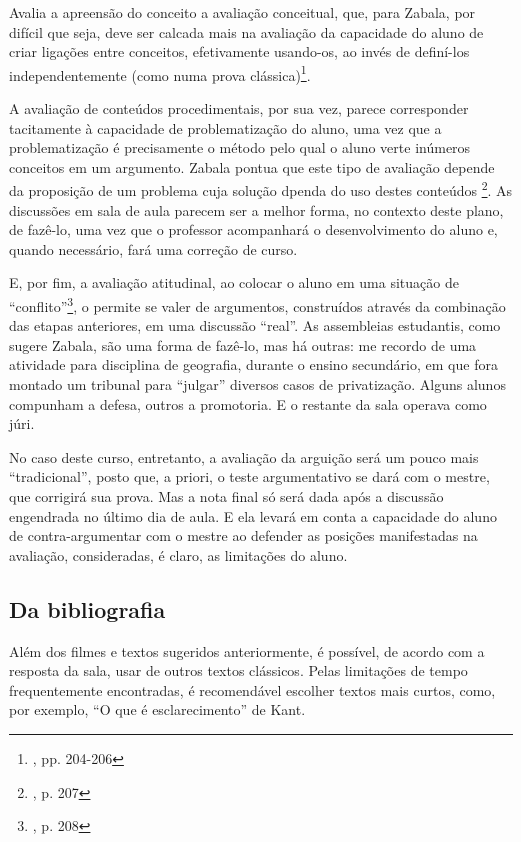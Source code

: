 \documentclass[12pt,a4paper]{article}
\newenvironment{citac}{
	\begin{addmargin}[4cm]{1em} \footnotesize}{\normalfont \end{addmargin}
}
\begin{document}
\begin{citac}
	Avalia a apreensão do conceito a avaliação conceitual, que, para 
	Zabala, por difícil que seja, deve ser calcada mais na avaliação 
	da capacidade do aluno de criar ligações entre conceitos, efetivamente 
	usando-os, ao invés de definí-los independentemente (como numa prova 
	clássica)\footnote{\cite{zabala}, pp. 204-206}. 

	A avaliação de conteúdos procedimentais, por sua vez, parece 
	corresponder tacitamente à capacidade de problematização do aluno, 
	uma vez que a problematização é precisamente o método pelo qual o 
	aluno verte inúmeros conceitos em um argumento. Zabala pontua que 
	este tipo de avaliação depende da proposição de um problema cuja 
	solução dpenda do uso destes conteúdos
	\footnote{\cite{zabala}, p. 207}. As discussões em sala de aula 
	parecem ser a melhor forma, no contexto deste plano, de fazê-lo, uma 
	vez que o professor acompanhará o desenvolvimento do aluno e, quando 
	necessário, fará uma correção de curso. 

	E, por fim, a avaliação atitudinal, ao colocar o aluno em uma situação 
	de “conflito”\footnote{\cite{zabala}, p. 208}, o permite se valer de 
	argumentos, construídos através da combinação das etapas anteriores, 
	em uma discussão “real”. As assembleias estudantis, como sugere 
	Zabala, são uma forma de fazê-lo, mas há outras: me recordo de uma 
	atividade para disciplina de geografia, durante o ensino secundário, 
	em que fora montado um tribunal para “julgar” diversos casos de 
	privatização. Alguns alunos compunham a defesa, outros a promotoria. 
	E o restante da sala operava como júri. 

	No caso deste curso, entretanto, a avaliação da arguição será um 
	pouco mais “tradicional”, posto que, a priori, o teste argumentativo 
	se dará com o mestre, que corrigirá sua prova. Mas a nota final só 
	será dada após a discussão engendrada no último dia de aula. E ela 
	levará em conta a capacidade do aluno de contra-argumentar com o 
	mestre ao defender as posições manifestadas na avaliação, consideradas, 
	é claro, as limitações do aluno. 

	\subsection{Da bibliografia}

	Além dos filmes e textos sugeridos anteriormente, é possível, de 
	acordo com a resposta da sala, usar de outros textos clássicos. 
	Pelas limitações de tempo frequentemente encontradas, é recomendável 
	escolher textos mais curtos, como, por exemplo, “O que é 
	esclarecimento” de Kant. 


\end{citac}
\end{document}

